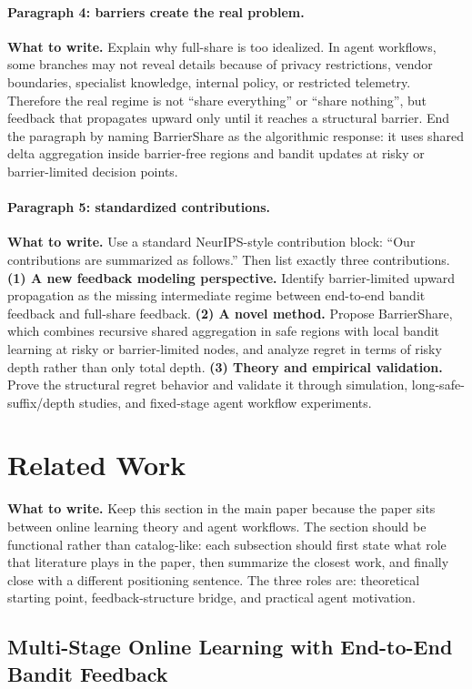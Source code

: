 \documentclass{article}
\newcommand{\towrite}[1]{\noindent\textbf{What to write.} #1}
\begin{document}
\paragraph{Paragraph 4: barriers create the real problem.}
\towrite{Explain why full-share is too idealized. In agent workflows, some branches may not reveal details because of privacy restrictions, vendor boundaries, specialist knowledge, internal policy, or restricted telemetry. Therefore the real regime is not ``share everything'' or ``share nothing'', but feedback that propagates upward only until it reaches a structural barrier. End the paragraph by naming BarrierShare as the algorithmic response: it uses shared delta aggregation inside barrier-free regions and bandit updates at risky or barrier-limited decision points.}

\paragraph{Paragraph 5: standardized contributions.}
\towrite{Use a standard NeurIPS-style contribution block: ``Our contributions are summarized as follows.'' Then list exactly three contributions. \textbf{(1) A new feedback modeling perspective.} Identify barrier-limited upward propagation as the missing intermediate regime between end-to-end bandit feedback and full-share feedback. \textbf{(2) A novel method.} Propose BarrierShare, which combines recursive shared aggregation in safe regions with local bandit learning at risky or barrier-limited nodes, and analyze regret in terms of risky depth rather than only total depth. \textbf{(3) Theory and empirical validation.} Prove the structural regret behavior and validate it through simulation, long-safe-suffix/depth studies, and fixed-stage agent workflow experiments.}

\section{Related Work}

\towrite{Keep this section in the main paper because the paper sits between online learning theory and agent workflows. The section should be functional rather than catalog-like: each subsection should first state what role that literature plays in the paper, then summarize the closest work, and finally close with a different positioning sentence. The three roles are: theoretical starting point, feedback-structure bridge, and practical agent motivation.}

\subsection{Multi-Stage Online Learning with End-to-End Bandit Feedback}
\end{document}
